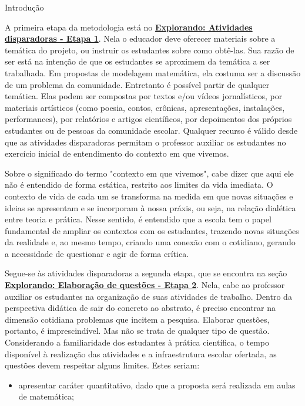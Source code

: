 \begin{apresentacao}{Introdução}

A primeira etapa da metodologia está no \hyperref[etapa1]{\textcolor{session1}{\textbf{Explorando: Atividades disparadoras - Etapa 1}}}. Nela o educador deve oferecer materiais sobre a temática do projeto, ou instruir os estudantes sobre como obtê-las. Sua razão de ser está na intenção de que os estudantes se aproximem da temática a ser trabalhada. Em propostas de modelagem matemática, ela costuma ser a discussão de um problema da comunidade. Entretanto é possível partir de qualquer temática. Elas podem ser compostas por textos e/ou vídeos jornalísticos, por materiais artísticos (como poesia, contos, crônicas, apresentações, instalações, performances), por relatórios e artigos científicos, por depoimentos dos próprios estudantes ou de pessoas da comunidade escolar. Qualquer recurso é válido desde que as atividades disparadoras permitam o professor auxiliar os estudantes no exercício inicial de entendimento do contexto em que vivemos.

Sobre o significado do termo "contexto em que vivemos"{}, cabe dizer que aqui ele não é entendido de forma estática, restrito aos limites da vida imediata. O contexto de vida de cada um se transforma na medida em que novas situações e ideias se apresentam e se incorporam à nossa práxis, ou seja, na relação dialética entre teoria e prática. Nesse sentido, é entendido que a escola tem o papel fundamental de ampliar os contextos com os estudantes, trazendo novas situações da realidade e, ao mesmo tempo, criando uma conexão com o cotidiano, gerando a necessidade de questionar e agir de forma crítica.

Segue-se às atividades disparadoras a segunda etapa, que se encontra na seção \hyperref[etapa2]{\textcolor{session1}{\textbf{Explorando: Elaboração de questões - Etapa 2}}}. Nela, cabe ao professor auxiliar os estudantes na organização de suas atividades de trabalho. Dentro da perspectiva didática de sair do concreto ao abstrato, é preciso encontrar na dimensão cotidiana problemas que incitem a pesquisa. Elaborar questões, portanto, é imprescindível. Mas não se trata de qualquer tipo de questão. Considerando a familiaridade dos estudantes à prática científica, o tempo disponível à realização das atividades e a infraestrutura escolar ofertada, as questões devem respeitar alguns limites. Estes seriam:

\begin{itemize}
\item apresentar caráter quantitativo, dado que a proposta será realizada em aulas de matemática;


\end{itemize}
\end{apresentacao}
